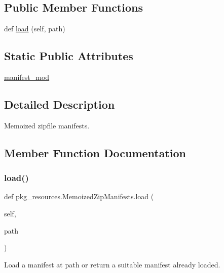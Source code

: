 \subsection*{Public Member Functions}
\begin{DoxyCompactItemize}
\item 
def \hyperlink{classpkg__resources_1_1MemoizedZipManifests_a50bc96483413c076fed78057393f6d3c}{load} (self, path)
\end{DoxyCompactItemize}
\subsection*{Static Public Attributes}
\begin{DoxyCompactItemize}
\item 
\hyperlink{classpkg__resources_1_1MemoizedZipManifests_a274e5a889fe7b201cdc04af67c10e708}{manifest\+\_\+mod}
\end{DoxyCompactItemize}


\subsection{Detailed Description}
\begin{DoxyVerb}Memoized zipfile manifests.
\end{DoxyVerb}
 

\subsection{Member Function Documentation}
\mbox{\label{classpkg__resources_1_1MemoizedZipManifests_a50bc96483413c076fed78057393f6d3c}} 
\subsubsection{\texorpdfstring{load()}{load()}}
{\footnotesize\ttfamily def pkg\+\_\+resources.\+Memoized\+Zip\+Manifests.\+load (\begin{DoxyParamCaption}\item[{}]{self,  }\item[{}]{path }\end{DoxyParamCaption})}

\begin{DoxyVerb}Load a manifest at path or return a suitable manifest already loaded.
\end{DoxyVerb}
 


